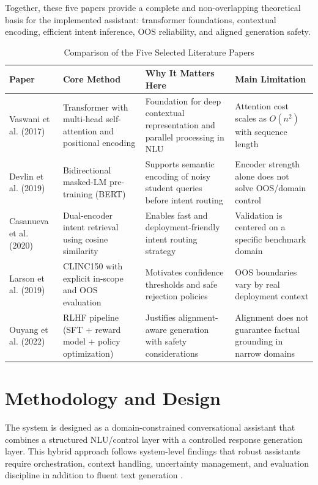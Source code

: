 \documentclass[12pt,onecolumn]{report}
\begin{document}
Together, these five papers provide a complete and non-overlapping theoretical basis for the implemented assistant: transformer foundations, contextual encoding, efficient intent inference, OOS reliability, and aligned generation safety.

\begin{table}[t]
\caption{Comparison of the Five Selected Literature Papers}
\label{tab:lit-compare-top5}
\centering
\small
\renewcommand{\arraystretch}{1.25}
\setlength{\tabcolsep}{6pt}
\begin{tabularx}{\textwidth}{>{\raggedright\arraybackslash}p{} >{\raggedright\arraybackslash}X >{\raggedright\arraybackslash}X >{\raggedright\arraybackslash}p{}}
\toprule
\textbf{Paper} & \textbf{Core Method} & \textbf{Why It Matters Here} & \textbf{Main Limitation} \\
\midrule
Vaswani et al. (2017) \cite{vaswani2017attention} & Transformer with multi-head self-attention and positional encoding & Foundation for deep contextual representation and parallel processing in NLU & Attention cost scales as $O(n^2)$ with sequence length \\
Devlin et al. (2019) \cite{devlin2019bert} & Bidirectional masked-LM pre-training (BERT) & Supports semantic encoding of noisy student queries before intent routing & Encoder strength alone does not solve OOS/domain control \\
Casanueva et al. (2020) \cite{casanueva2020banking77} & Dual-encoder intent retrieval using cosine similarity & Enables fast and deployment-friendly intent routing strategy & Validation is centered on a specific benchmark domain \\
Larson et al. (2019) \cite{larson2019clinc150} & CLINC150 with explicit in-scope and OOS evaluation & Motivates confidence thresholds and safe rejection policies & OOS boundaries vary by real deployment context \\
Ouyang et al. (2022) \cite{ouyang2022rlhf} & RLHF pipeline (SFT + reward model + policy optimization) & Justifies alignment-aware generation with safety considerations & Alignment does not guarantee factual grounding in narrow domains \\
\bottomrule
\end{tabularx}
\end{table}

\chapter{Methodology and Design}
The system is designed as a domain-constrained conversational assistant that combines a structured NLU/control layer with a controlled response generation layer. This hybrid approach follows system-level findings that robust assistants require orchestration, context handling, uncertainty management, and evaluation discipline in addition to fluent text generation \cite{caldarini2022literature,gao2020recent,gao2019neural,khatri2018alexa,maroengsit2019evaluation}.
\end{document}
